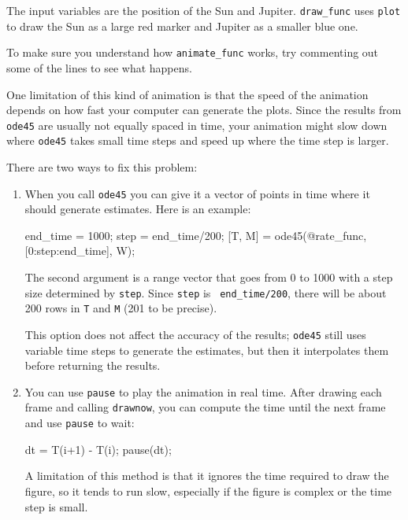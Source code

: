 \documentclass[
]{book}
\numberwithin{Answer}{chapter}
\numberwithin{Exercise}{chapter}
\begin{document}
The input variables are the position of the Sun and Jupiter.
{\tt draw\_func} uses {\tt plot} to draw
the Sun as a large red marker and Jupiter as a smaller blue one.

\begin{ex}
To make sure you understand how {\tt animate\_func} works,
try commenting out some of the lines to see what happens.
\end{ex}

One limitation of this kind of animation is that the speed
of the animation depends on how fast your computer can generate
the plots.  Since the results from {\tt ode45} are usually not
equally spaced in time, your animation might slow down where
{\tt ode45} takes small time steps and speed up where the time
step is larger.

There are two ways to fix this problem:

\begin{enumerate}

\item When you call {\tt ode45} you can give it a vector of
points in time where it should generate estimates.  Here is
an example:

\begin{code}
end_time = 1000;
step = end_time/200;
[T, M] = ode45(@rate_func, [0:step:end_time], W);
\end{code}

The second argument is a range vector that goes from 0 to 1000 with a
step size determined by {\tt step}.  Since {\tt step} is {\tt
end\_time/200}, there will be about 200 rows in {\tt T} and {\tt M}
(201 to be precise).

This option does not affect the accuracy of the results; {\tt ode45}
still uses variable time steps to generate the estimates, but then it
interpolates them before returning the results.

\item You can use {\tt pause} to play the animation in
real time.  After drawing each frame and calling
{\tt drawnow}, you can compute the time
until the next frame and use {\tt pause} to wait:

\begin{code}
dt = T(i+1) - T(i);
pause(dt);
\end{code}

A limitation of this method is that it ignores the time required to
draw the figure, so it tends to run slow, especially if the figure is
complex or the time step is small.

\end{enumerate}
\end{document}
